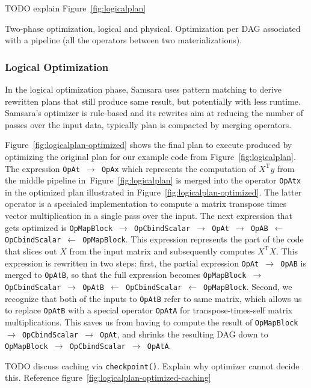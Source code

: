 \documentclass{article}
\begin{document}
TODO explain Figure~\ref{fig:logicalplan}

Two-phase optimization, logical and physical. Optimization per DAG associated with a pipeline (all the operators between two materializations).

\subsubsection{Logical Optimization}

In the logical optimization phase, Samsara uses pattern matching to derive rewritten plans that still produce same result, but potentially with less runtime. Samsara's optimizer is rule-based and its rewrites aim at reducing the number of passes over the input data, typically plan is compacted by merging operators. 

Figure~\ref{fig:logicalplan-optimized} shows the final plan to execute produced by optimizing the original plan for our example code from Figure~\ref{fig:logicalplan}. The expression \texttt{OpAt $\rightarrow$ OpAx} which represents the computation of $X^\mathrm{T}y$ from the middle pipeline in~Figure~\ref{fig:logicalplan} is merged into the operator \texttt{OpAtx} in the optimized plan illustrated in Figure~\ref{fig:logicalplan-optimized}. The latter operator is a specialed implementation to compute a matrix transpose times vector multiplication in a single pass over the input. The next expression that gets optimized is \texttt{OpMapBlock $\rightarrow$ OpCbindScalar $\rightarrow$ OpAt $\rightarrow$ OpAB $\leftarrow$ OpCbindScalar $\leftarrow$ OpMapBlock}. This expression represents the part of the code that slices out $X$ from the input matrix and subsequently computes $X^\mathrm{T}X$. This expression is rewritten in two steps: first, the partial expression \texttt{OpAt $\rightarrow$ OpAB} is merged to \texttt{OpAtB}, so that the full expression becomes \texttt{OpMapBlock $\rightarrow$ OpCbindScalar $\rightarrow$ OpAtB $\leftarrow$ OpCbindScalar $\leftarrow$ OpMapBlock}. Second, we recognize that both of the inputs to \texttt{OpAtB} refer to same matrix, which allows us to replace \texttt{OpAtB} with a special operator \texttt{OpAtA} for transpose-times-self matrix multiplications. This saves us from having to compute the result of \texttt{OpMapBlock $\rightarrow$ OpCbindScalar $\rightarrow$ OpAt}, and shrinks the resulting DAG down to \texttt{OpMapBlock $\rightarrow$ OpCbindScalar $\rightarrow$ OpAtA}.

TODO discuss caching via \texttt{checkpoint()}. Explain why optimizer cannot decide this. Reference figure~\ref{fig:logicalplan-optimized-caching}
\end{document}
